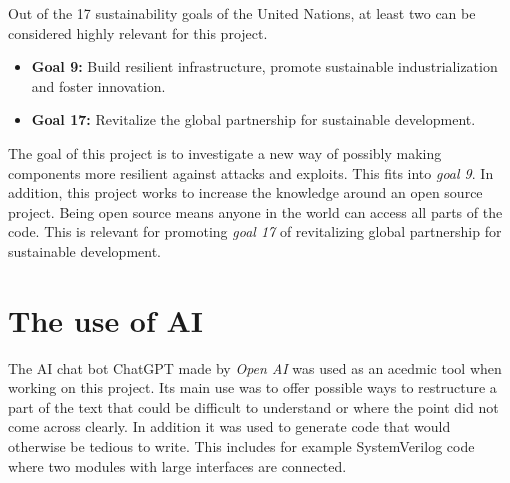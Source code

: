 Out of the 17 sustainability goals of the United Nations\cite{un}, at least two can be considered highly relevant for this project. 

\begin{itemize}
    \item \textbf{Goal 9:} Build resilient infrastructure, promote sustainable industrialization and foster innovation.
    \item \textbf{Goal 17:} Revitalize the global partnership for sustainable development.
\end{itemize}

The goal of this project is to investigate a new way of possibly making components more resilient against attacks and exploits. This fits into \textit{goal 9}. In addition, this project works to increase the knowledge around an open source project. Being open source means anyone in the world can access all parts of the code. This is relevant for promoting \textit{goal 17} of revitalizing global partnership for sustainable development. 

\section{The use of AI}
\label{sec:AI}

The AI chat bot ChatGPT made by \textit{Open AI}\cite{chat} was used as an acedmic tool when working on this project. Its main use was to offer possible ways to restructure a part of the text that could be difficult to understand or where the point did not come across clearly. In addition it was used to generate code that would otherwise be tedious to write. This includes for example SystemVerilog code where two modules with large interfaces are connected. 